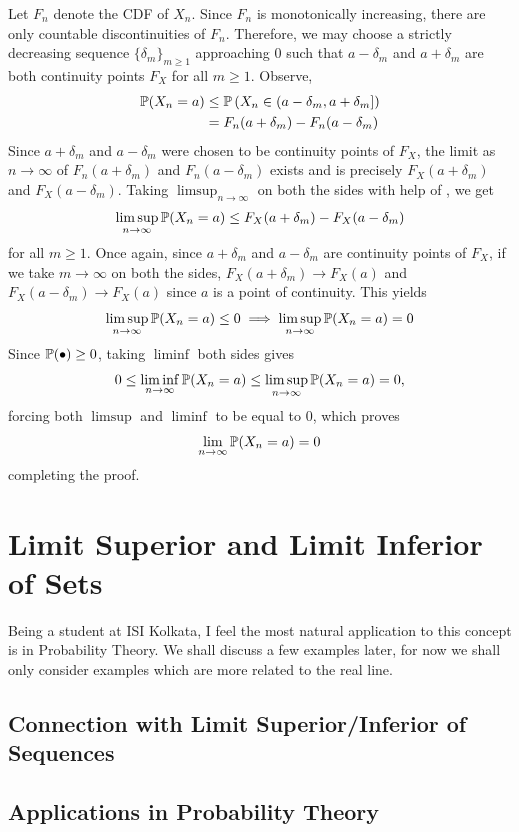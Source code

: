 \documentclass[parskip=half, numbers=endperiod, 11pt]{scrartcl}
\begin{document}
\begin{sol}
	Let $F_n$ denote the CDF of $X_n$. Since $F_n$ is
	monotonically increasing, there are only countable
	discontinuities of $F_n$. Therefore, we may choose
	a strictly decreasing sequence
	$\{\delta_m\}_{m \ge 1}$ approaching $0$ such that
	$a-\delta_m$ and $a+\delta_m$ are both continuity
	points $F_X$ for all $m \ge 1$. Observe,
	\begin{align*}
		\mathbb{P}(X_n = a) & \le \mathbb{P}\left(X_n \in (a-\delta_m, a+\delta_m]\right) \\
		             & = F_n(a+\delta_m) - F_n(a - \delta_m)
	\end{align*}
	Since $a+\delta_m$ and $a-\delta_m$
	were chosen to be continuity points of $F_X$, the
	limit as $n \to \infty$ of $F_n(a+\delta_m)$
	and $F_n(a - \delta_m)$ exists and is precisely
	$F_X(a + \delta_m)$ and $F_X(a - \delta_m)$.
	Taking $\limsup_{n \to \infty}$ on both the sides
	with help of , we get
	\[\limsup_{n \to \infty} \mathbb{P}(X_n = a) \le F_X(a + \delta_m) - F_X(a - \delta_m) \]
	for all $m \ge 1$. Once again, since $a+\delta_m$
	and $a - \delta_m$ are continuity points of $F_X$,
	if we take $m \to \infty$ on both the sides,
	$F_X(a + \delta_m) \to F_X(a)$ and
	$F_X(a - \delta_m) \to F_X(a)$ since $a$ is a point
	of continuity. This yields
	\[\limsup_{n \to \infty} \mathbb{P}(X_n = a) \le 0 \implies \limsup_{n \to \infty} \mathbb{P}(X_n = a) = 0 \]
	Since $\mathbb{P}(\bullet) \ge 0$, taking $\liminf$ both
	sides gives
	\[0 \le \liminf_{n \to \infty} \mathbb{P}(X_n = a) \le \limsup_{n \to \infty} \mathbb{P}(X_n = a) = 0,  \]
	forcing both $\limsup$ and $\liminf$ to be
	equal to $0$, which proves
	\[\lim_{n \to \infty} \mathbb{P}(X_n = a) = 0 \]
	completing the proof.
\end{sol}

\section{Limit Superior and Limit Inferior of Sets}
Being a student at ISI Kolkata, I feel the most natural
application to this concept is in Probability Theory.
We shall discuss a few examples later, for now we shall
only consider examples which are more related to the real
line.


\subsection{Connection with Limit Superior/Inferior of Sequences}

\subsection{Applications in Probability Theory}
\end{document}
